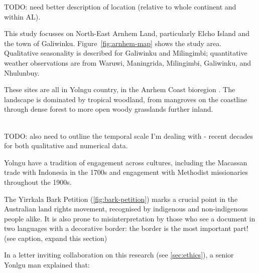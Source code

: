 TODO:  need better description of location (relative to whole continent and within AL).

This study focusses on North-East Arnhem Land, particularly Elcho Island
and the town of Galiwinku.  Figure~\ref{fig:arnhem-map} shows the study area.
Qualitative seasonality is described for Galiwinku and Milingimbi;
quantitative weather observations are from Waruwi, Maningrida, Milingimbi,
Galiwinku, and Nhulunbuy.

These sites are all in Yolngu country, in the Anrhem Coast bioregion \citep{ens2014}.
The landscape is dominated by tropical woodland, from mangroves on the coastline
through dense forest to more open woody grasslands further inland.

~\\

TODO:  also need to outline the temporal scale I'm dealing with - recent
decades for both qualitative and numerical data.


Yolngu have a tradition of engagement across cultures, including
the Macassan trade with Indonesia in the 1700s and engagement with Methodist
missionaries throughout the 1900s.

The Yirrkala Bark Petition (\autoref{fig:bark-petition}) marks a crucial
point in the Australian land rights movement, recognised by indigenous and
non-indigenous people alike.  It is also prone to misinterpretation by those
who see a document in two languages with a decorative border: the border
is the most important part!  (see caption, expand this section)




In a letter inviting collaboration on this research (see \autoref{sec:ethics}),
a senior Yonlgu man explained that:


